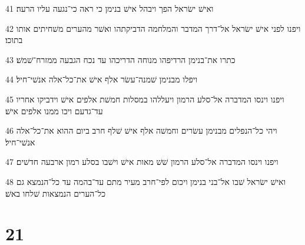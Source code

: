 \par 41 ואישׁ ישׂראל הפך ויבהל אישׁ בנימן כי ראה כי־נגעה עליו הרעה׃
\par 42 ויפנו לפני אישׁ ישׂראל אל־דרך המדבר והמלחמה הדביקתהו ואשׁר מהערים משׁחיתים אותו בתוכו׃
\par 43 כתרו את־בנימן הרדיפהו מנוחה הדריכהו עד נכח הגבעה ממזרח־שׁמשׁ׃
\par 44 ויפלו מבנימן שׁמנה־עשׂר אלף אישׁ את־כל־אלה אנשׁי־חיל׃
\par 45 ויפנו וינסו המדברה אל־סלע הרמון ויעללהו במסלות חמשׁת אלפים אישׁ וידביקו אחריו עד־גדעם ויכו ממנו אלפים אישׁ׃
\par 46 ויהי כל־הנפלים מבנימן עשׂרים וחמשׁה אלף אישׁ שׁלף חרב ביום ההוא את־כל־אלה אנשׁי־חיל׃
\par 47 ויפנו וינסו המדברה אל־סלע הרמון שׁשׁ מאות אישׁ וישׁבו בסלע רמון ארבעה חדשׁים׃
\par 48 ואישׁ ישׂראל שׁבו אל־בני בנימן ויכום לפי־חרב מעיר מתם עד־בהמה עד כל־הנמצא גם כל־הערים הנמצאות שׁלחו באשׁ׃

\chapter{21}

